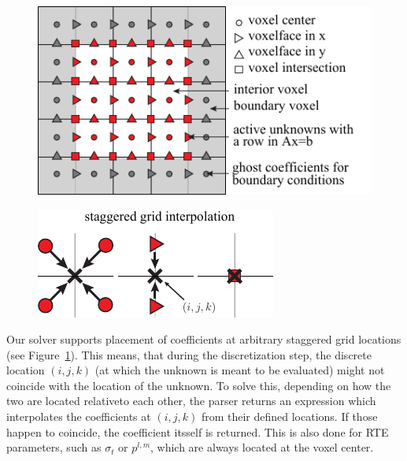 \begin{figure}[h]

\centering
\includegraphics[width=0.9\columnwidth]{figures/fig_staggered_grids.pdf}
\label{fig:staggeredgrid}
\end{figure}

\begin{figure}
\hspace{-.1in}
\includegraphics[width=0.6\columnwidth]{figures/fig_staggered_interpolation.pdf}
\vspace{-.1in}
\end{figure}Our solver supports placement of coefficients at arbitrary staggered grid locations (see Figure~\ref{fig:staggeredgrid}). This means, that during the discretization step, the discrete location $(i, j, k)$ (at which the unknown is meant to be evaluated) might not coincide with the location of the unknown. To solve this, depending on how the two are located relativeto each other, the parser returns an expression which interpolates the coefficients at $(i, j, k)$ from their defined locations. If those happen to coincide, the coefficient itsself is returned. This is also done for RTE parameters, such as $\sigma_t$ or $p^{l,m}$, which are always located at the voxel center.


